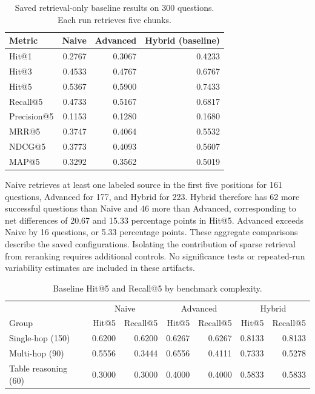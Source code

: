 \documentclass[oneside]{sn-jnl}
\begin{document}
\begin{table}[htbp]
\centering
\caption{Saved retrieval-only baseline results on 300 questions. Each run retrieves five chunks.}
\label{tab:results}
\begin{tabular}{lrrr}
\toprule
Metric & Naive & Advanced & Hybrid (baseline)\\
\midrule
Hit@1 & 0.2767 & 0.3067 & 0.4233\\
Hit@3 & 0.4533 & 0.4767 & 0.6767\\
Hit@5 & 0.5367 & 0.5900 & 0.7433\\
Recall@5 & 0.4733 & 0.5167 & 0.6817\\
Precision@5 & 0.1153 & 0.1280 & 0.1680\\
MRR@5 & 0.3747 & 0.4064 & 0.5532\\
NDCG@5 & 0.3773 & 0.4093 & 0.5607\\
MAP@5 & 0.3292 & 0.3562 & 0.5019\\
\bottomrule
\end{tabular}
\end{table}

Naive retrieves at least one labeled source in the first five positions for 161 questions, Advanced for 177, and Hybrid for 223. Hybrid therefore has 62 more successful questions than Naive and 46 more than Advanced, corresponding to net differences of 20.67 and 15.33 percentage points in Hit@5. Advanced exceeds Naive by 16 questions, or 5.33 percentage points. These aggregate comparisons describe the saved configurations. Isolating the contribution of sparse retrieval from reranking requires additional controls. No significance tests or repeated-run variability estimates are included in these artifacts.

\begin{table}[htbp]
\centering
\caption{Baseline Hit@5 and Recall@5 by benchmark complexity.}
\label{tab:slices}
\begin{tabular}{lrrrrrr}
\toprule
 & \multicolumn{2}{c}{Naive} & \multicolumn{2}{c}{Advanced} & \multicolumn{2}{c}{Hybrid}\\
Group & Hit@5 & Recall@5 & Hit@5 & Recall@5 & Hit@5 & Recall@5\\
\midrule
Single-hop (150) & 0.6200 & 0.6200 & 0.6267 & 0.6267 & 0.8133 & 0.8133\\
Multi-hop (90) & 0.5556 & 0.3444 & 0.6556 & 0.4111 & 0.7333 & 0.5278\\
Table reasoning (60) & 0.3000 & 0.3000 & 0.4000 & 0.4000 & 0.5833 & 0.5833\\
\bottomrule
\end{tabular}
\end{table}
\end{document}
